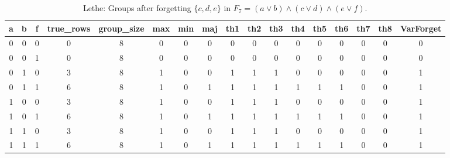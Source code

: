 \begin{table}[!tb]
    \centering
    \begin{tabular}{|c|c|c|c|c|c|c|c|c|c|c|c|c|c|c|c|c|}
        \hline
        \textbf{a} & \textbf{b} & \textbf{f} & \textbf{true\_rows} & \textbf{group\_size} & \textbf{max} & \textbf{min} & \textbf{maj} & \textbf{th1} & \textbf{th2} & \textbf{th3} & \textbf{th4} & \textbf{th5} & \textbf{th6} & \textbf{th7} & \textbf{th8} & \textbf{VarForget} \\ \hline
        \rowcolor{gray!40} 0 & 0 & 0 & 0 & 8 & 0 & 0 & 0 & 0 & 0 & 0 & 0 & 0 & 0 & 0 & 0 & 0 \\ \hline
        \rowcolor{blue!40} 0 & 0 & 1 & 0 & 8 & 0 & 0 & 0 & 0 & 0 & 0 & 0 & 0 & 0 & 0 & 0 & 0 \\ \hline
        \rowcolor{red!40} 0 & 1 & 0 & 3 & 8 & 1 & 0 & 0 & 1 & 1 & 1 & 0 & 0 & 0 & 0 & 0 & 1 \\ \hline
        \rowcolor{green!40} 0 & 1 & 1 & 6 & 8 & 1 & 0 & 1 & 1 & 1 & 1 & 1 & 1 & 1 & 0 & 0 & 1 \\ \hline
        \rowcolor{yellow!40} 1 & 0 & 0 & 3 & 8 & 1 & 0 & 0 & 1 & 1 & 1 & 0 & 0 & 0 & 0 & 0 & 1 \\ \hline
        \rowcolor{gray!40} 1 & 0 & 1 & 6 & 8 & 1 & 0 & 1 & 1 & 1 & 1 & 1 & 1 & 1 & 0 & 0 & 1 \\ \hline
        \rowcolor{blue!40} 1 & 1 & 0 & 3 & 8 & 1 & 0 & 0 & 1 & 1 & 1 & 0 & 0 & 0 & 0 & 0 & 1 \\ \hline
        \rowcolor{red!40} 1 & 1 & 1 & 6 & 8 & 1 & 0 & 1 & 1 & 1 & 1 & 1 & 1 & 1 & 0 & 0 & 1 \\ \hline
    \end{tabular}
    \caption{Lethe: Groups after forgetting $\{c, d, e\}$ in $F_{7} = (a \lor b) \land (c \lor d) \land (e \lor f)$.}
    \label{tab:lethe-F7-cde-groups}
\end{table}
